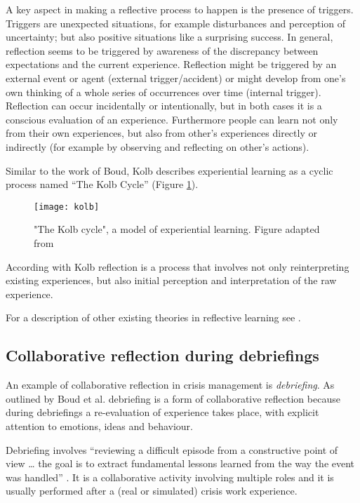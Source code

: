 A key aspect in making a reflective process to happen is the presence of triggers. Triggers are unexpected situations, for example disturbances and perception of uncertainty; but also positive situations like a surprising success. In general, reflection seems to be triggered by awareness of the discrepancy between expectations and the current experience. Reflection might be triggered by an external event or agent (external trigger/accident) or might develop from one's own thinking of a whole series of occurrences over time (internal trigger). Reflection can occur incidentally or intentionally, but in both cases it is a conscious evaluation of an experience. Furthermore people can learn not only from their own experiences, but also from other's experiences directly or indirectly (for example by observing and reflecting on other's actions).

Similar to the work of Boud, Kolb describes experiential learning as a cyclic process named ``The Kolb Cycle'' (Figure \ref{fig:kolb-model}).

\begin{figure}
	[tbh] \centering 
	\texttt{[image: kolb]} 
	\caption{"The Kolb cycle", a model of experiential learning. Figure adapted from \protect\autocite{kolb1984organizational}} \label{fig:kolb-model} 
\end{figure}

According with Kolb \autocite*{kolb1984experiential} reflection is a process that involves not only reinterpreting existing experiences, but also initial perception and interpretation of the raw experience.

For a description of other existing theories in reflective learning see \autocite{WoodDaudelin199636}.

\subsection{Collaborative reflection during debriefings}\label{debriefing-crisis-management-work-an-example-of-collaborative-reflection}

An example of collaborative reflection in crisis management is \emph{debriefing}. As outlined by Boud et al. \autocite*{boud1985reflection} debriefing is a form of collaborative reflection because during debriefings a re-evaluation of experience takes place, with explicit attention to emotions, ideas and behaviour.

Debriefing involves ``reviewing a difficult episode from a constructive point of view \ldots{} the goal is to extract fundamental lessons learned from the way the event was handled'' \autocite{Lagadec:1997js}. It is a collaborative activity involving multiple roles and it is usually performed after a (real or simulated) crisis work experience. 

